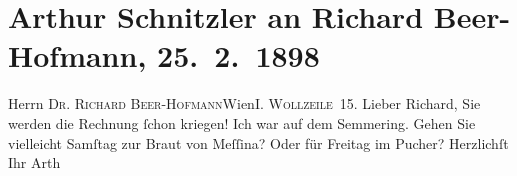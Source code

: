 

         
         \renewcommand{\erwaehntePersonen}{Personen: Richard Beer-Hofmann}
         \renewcommand{\erwaehnteOrte}{Orte: Café Pucher, I., Innere Stadt, Semmering, Wien, Wollzeile}
         \renewcommand{\erwaehnteWerke}{Werke: Die Braut von Messina oder die feindlichen Brüder}
               \section[Arthur Schnitzler an Richard Beer-Hofmann, 25. 2. 1898]{ Arthur Schnitzler an Richard Beer-Hofmann, 25. 2. 1898}\nopagebreak{}\rehead{ }\begin{ledgroupsized}[t]{13cm}\normalsize\beginnumbering \toendnotes[C]{\smallbreak\pagebreak[2]} 
\pstart{}{\pb}Herrn \textsc{Dr. Richard
                     Beer-Hofmann}\pend{}\pstart{}Wien\pend{}\pstart{}\textsc{I. Wollzeile 15}.\pend{}{\bigskip}\pstart
           \noindent{}{\pb}Lieber Richard, Sie werden die Rechnung ſchon kriegen!\pend
           \pstart
           Ich war auf dem Semmering.\pend
           \pstart
           Gehen Sie vielleicht Samſtag zur Braut
                  von Meſſina?\pend
           \pstart
           Oder für Freitag im Pucher?\pend
           \pstart Herzlichſt Ihr \spacefill\mbox{Arth}\pend{}
         
         \endnumbering{}\end{ledgroupsized}  \newcommand{\dateiname}{L00777}\newcommand{\titel}{Arthur Schnitzler an Richard Beer-Hofmann, 25. 2. 1898}\newcommand{\editorInnen}{Martin Anton Müller und Gerd-Hermann Susen}
      